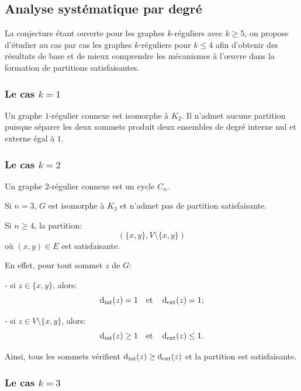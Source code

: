 \subsection{Analyse systématique par degré}

La conjecture étant ouverte pour les graphes \(k\)-réguliers avec \(k \geq 5\), on propose d'étudier au cas par cas les graphes \(k\)-réguliers pour \(k \leq 4\) afin d'obtenir des résultats de base et de mieux comprendre les mécanismes à l'œuvre dans la formation de partitions satisfaisantes.

\subsubsection{Le cas \(k=1\)}

Un graphe \(1\)-régulier connexe est isomorphe à \(K_2\).
Il n'admet aucune partition puisque séparer les deux sommets produit deux ensembles de degré interne nul et externe égal à \(1\).


\subsubsection{Le cas \(k=2\)}

Un graphe \(2\)-régulier connexe est un cycle \(C_n\).

Si \(n=3\), \(G\) est isomorphe à \(K_3\) et n'admet pas de partition satisfaisante.

Si \(n \geq 4\), la partition:
\[
    (\{x,y\}, V \setminus \{x,y\})
\]
où \((x,y) \in E\) est satisfaisante.

En effet, pour tout sommet \(z\) de \(G\):

- si \(z \in \{x,y\}\), alors:
\[
    \operatorname{d_{\mathrm{int}}}(z)=1 \quad \text{et} \quad \operatorname{d_{\mathrm{ext}}}(z)=1 ;
\]

- si \(z \in V \setminus \{x,y\}\), alors:
\[
    \operatorname{d_{\mathrm{int}}}(z)\geq1 \quad \text{et} \quad \operatorname{d_{\mathrm{ext}}}(z)\leq1.
\]

Ainsi, tous les sommets vérifient \(\operatorname{d_{\mathrm{int}}}(z) \geq \operatorname{d_{\mathrm{ext}}}(z)\) et la partition est satisfaisante.

\subsubsection{Le cas \(k = 3\)}\label{subsubsec:ss4_2_3}

